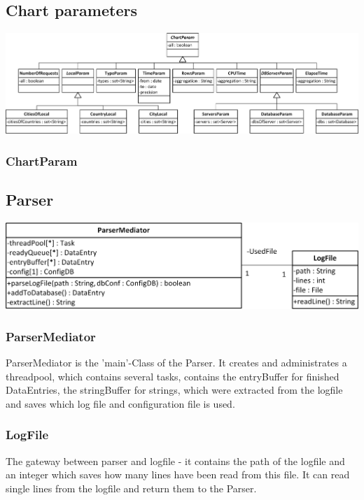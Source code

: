 \subsection{Chart parameters}
\begin{center}
\includegraphics[width=1\linewidth]{Pictures/Parts/ChartPara.png}
\end{center}  
\subsubsection*{ChartParam} 



\subsection{Parser}

\begin{center}
\includegraphics{Pictures/Parts/ParsMedi.png}
\end{center}  

\subsubsection*{ParserMediator}
ParserMediator is the 'main'-Class of the Parser. It creates and administrates a threadpool, which contains several tasks, 
contains the entryBuffer for finished DataEntries, the stringBuffer for strings, which were extracted 
from the logfile and saves which log file and configuration file is used.

\subsubsection*{LogFile}
The gateway between parser and logfile - it contains the path of the logfile and an integer 
which saves how many lines have been read from this file. It can read single lines from the logfile and return them to 
the Parser.

